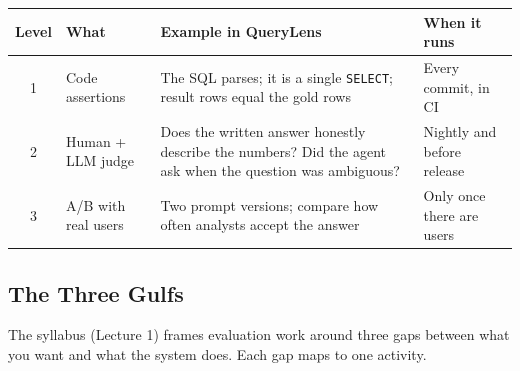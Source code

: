 \documentclass[11pt,a4paper]{article}
\newcommand{\code}[1]{\texttt{\small #1}}
\begin{document}
\begin{center}
\begin{tabularx}{\linewidth}{@{}c l X l@{}}
\toprule
\textbf{Level} & \textbf{What} & \textbf{Example in QueryLens} & \textbf{When it runs}\\
\midrule
1 & Code assertions & The SQL parses; it is a single \code{SELECT}; result rows equal the gold rows & Every commit, in CI\\
2 & Human + LLM judge & Does the written answer honestly describe the numbers? Did the agent ask when the question was ambiguous? & Nightly and before release\\
3 & A/B with real users & Two prompt versions; compare how often analysts accept the answer & Only once there are users\\
\bottomrule
\end{tabularx}
\end{center}

\subsection{The Three Gulfs}

The syllabus (Lecture 1) frames evaluation work around three gaps between what you want and
what the system does. Each gap maps to one activity.

\begin{center}
\end{center}
\end{document}
